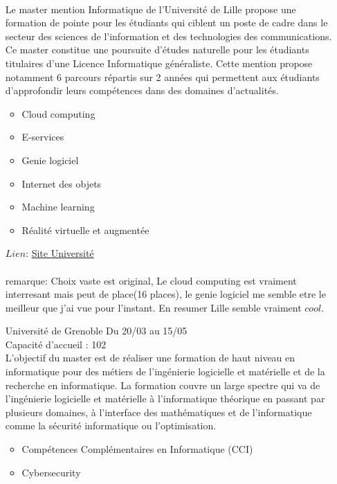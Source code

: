 \documentclass[a4paper,11pt]{article}
\begin{document}
\begin{enumerate}
                \\Le master mention Informatique de l’Université de Lille propose une formation de pointe pour les étudiants qui ciblent un poste de cadre dans le secteur des sciences de l’information et des technologies des communications. Ce master constitue une poursuite d’études naturelle pour les étudiants titulaires d’une Licence Informatique généraliste. Cette mention propose notamment 6 parcours répartis sur 2 années qui permettent aux étudiants d’approfondir leurs compétences dans des domaines d’actualités. 
                \begin{itemize}
                    \item Cloud computing
                    \item E-services
                    \item Genie logiciel
                    \item Internet des objets
                    \item Machine learning
                    \item Réalité virtuelle et augmentée
                \end{itemize}
                $Lien$: \href{https://sciences-technologies.univ-lille.fr/informatique/formation/master-informatique}{Site Université}\\
                \\remarque: Choix vaste est original, Le cloud computing est vraiment interresant mais peut de place(16 places), le genie logiciel me semble etre le meilleur que j'ai vue pour l'instant. En resumer Lille semble vraiment $cool$.
\\
        \item [\color{LightOrangeHaf}Université de Grenoble] Du 20/03 au 15/05
                \\Capacité d'accueil : 102
                \\L’objectif du master est de réaliser une formation de haut niveau en informatique pour des métiers de l’ingénierie logicielle et matérielle et de la recherche en informatique. La formation couvre un large spectre qui va de l’ingénierie logicielle et matérielle à l’informatique théorique en passant par plusieurs domaines, à l’interface des mathématiques et de l’informatique comme la sécurité informatique ou l’optimisation.
                \begin{itemize}
                    \item Compétences Complémentaires en Informatique (CCI) 
                    \item Cybersecurity

\end{itemize}
\end{enumerate}
\end{document}
